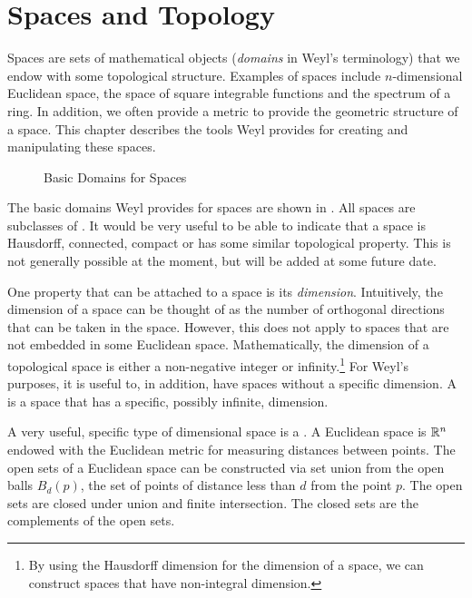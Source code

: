 \chapter{Spaces and Topology}
\label{Topology:Chap}

Spaces are sets of mathematical objects ({\em domains} in Weyl's
terminology) that we endow with some topological structure. Examples
of spaces include $n$-dimensional Euclidean space, the space of square
integrable functions and the spectrum of a ring. In addition, we often
provide a metric to provide the geometric structure of a space.  This
chapter describes the tools Weyl provides for creating and
manipulating these spaces.
  
\begin{figure}
\begin{center}
\end{center}
\caption{Basic Domains for Spaces\label{SpaceDomains:Fig}}
\end{figure}

The basic domains Weyl provides for spaces are shown in
.  All spaces are subclasses of
. It would be very useful to be able to
indicate that a space is Hausdorff, connected, compact or has some
similar topological property. This is not generally possible at the
moment, but will be added at some future date.
  
One property that can be attached to a space is its {\em
dimension}. Intuitively, the dimension of a space can be thought of as
the number of orthogonal directions that can be taken in the
space. However, this does not apply to spaces that are not embedded in
some Euclidean space. Mathematically, the dimension of a topological
space is either a non-negative integer or infinity.\footnote{By using
the Hausdorff dimension for the dimension of a space, we can construct
spaces that have non-integral dimension.} For Weyl's purposes, it is
useful to, in addition, have spaces without a specific dimension. A
 is a space that has a specific, possibly
infinite, dimension.
  
A very useful, specific type of dimensional space is a . A Euclidean space is ${\Bbb R}^n$ endowed with the Euclidean metric
for measuring distances between points. The open sets of a Euclidean
space can be constructed via set union from the open balls $B_d(p)$,
the set of points of distance less than $d$ from the point $p$. The
open sets are closed under union and finite intersection.  The closed
sets are the complements of the open sets.

